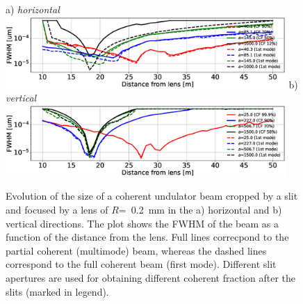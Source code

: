 \documentclass{iucr}              %
\begin{document}
\begin{figure}\label{fig:oneTFundPartialCoherence}
    \flushleft a) {\it horizontal}\\ \centering
    \includegraphics[width=0.95\textwidth]{figures/oneTF_UndSource_RectSlit_R200um_PartialCoherence_h.eps}
    \flushleft b) {\it vertical}\\ \centering
    \includegraphics[width=0.95\textwidth]{figures/oneTF_UndSource_RectSlit_R200um_PartialCoherence_v.eps}

    \caption{Evolution of the size of a coherent undulator beam cropped by a slit and focused by a lens of $R$=~\SI{0.2}{\milli\meter} in the a) horizontal and b) vertical directions.
    The plot shows the FWHM of the beam  as a function of the distance from the lens.
    Full lines correcpond to the partial coherent (multimode) beam, whereas the dashed lines correspond to the full coherent beam (first mode). Different slit apertures are used for obtaining different coherent fraction after the slits (marked in legend).
    }
\end{figure}
\end{document}
